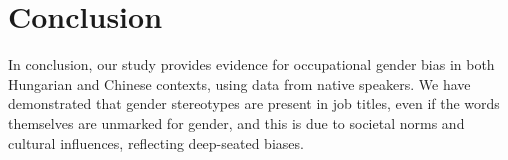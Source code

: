 \documentclass[11pt]{article}
\begin{document}





\section{Conclusion}




In conclusion, our study provides evidence for occupational gender bias in both Hungarian and Chinese contexts, using data from native speakers. We have demonstrated that gender stereotypes are present in job titles, even if the words themselves are unmarked for gender, and this is due to societal norms and cultural influences, reflecting deep-seated biases.
\end{document}
